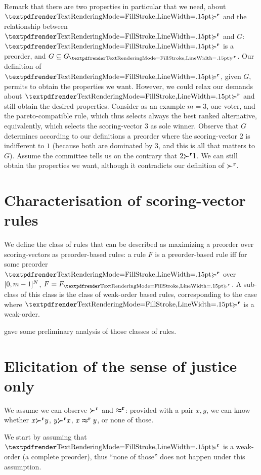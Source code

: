 \documentclass[version=last, pagesize, twoside=off, bibliography=totoc, DIV=calc, fontsize=14pt, a4paper, french, english]{scrartcl}
\begin{document}

Remark that there are two properties in particular that we need, about $\prefsv$ and the relationship between $\prefsv$ and $G$: $\prefsv$ is a preorder, and $G \subseteq G_{\prefsv}$. Our definition of $\prefsv$, given $G$, permits to obtain the properties we want. However, we could relax our demands about $\prefsv$ and still obtain the desired properties. Consider as an example $m = 3$, one voter, and the pareto-compatible rule, which thus selects always the best ranked alternative, equivalently, which selects the scoring-vector $3$ as sole winner. Observe that $G$ determines according to our definitions a preorder where the scoring-vector $2$ is indifferent to $1$ (because both are dominated by $3$, and this is all that matters to $G$). Assume the committee tells us on the contrary that $2 {\boldsymbol{\succ}^\textbf{r}} 1$. We can still obtain the properties we want, although it contradicts our definition of ${\boldsymbol{\succ}^\textbf{r}}$.

\section{Characterisation of scoring-vector rules}
We define the class of rules that can be described as maximizing a preorder over scoring-vectors as preorder-based rules: a rule $F$ is a preorder-based rule iff for some preorder $\prefsv$ over $[0, m-1]^N$, $F = F_{\prefsv}$. A sub-class of this class is the class of weak-order based rules, corresponding to the case where $\prefsv$ is a weak-order.

\citet{cailloux_eliciting_2014} gave some preliminary analysis of those classes of rules.


\section{Elicitation of the sense of justice only}
We assume we can observe ${\boldsymbol{\succ}^\textbf{r}}$ and $\boldsymbol{\approx}^\textbf{r}$: provided with a pair $x, y$, we can know whether $x {\boldsymbol{\succ}^\textbf{r}} y$, $y {\boldsymbol{\succ}^\textbf{r}} x$, $x \boldsymbol{\approx}^\textbf{r} y$, or none of those.

We start by assuming that $\prefsv$ is a weak-order (a complete preorder), thus “none of those” does not happen under this assumption.
\end{document}
